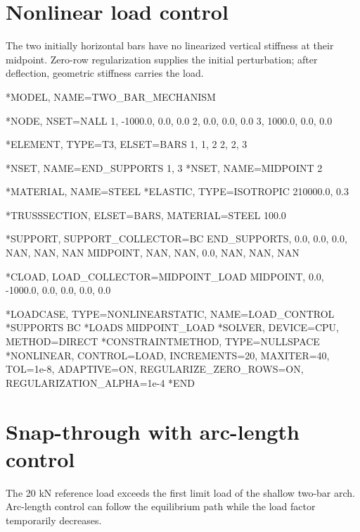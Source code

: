 \section{Nonlinear load control}

The two initially horizontal bars have no linearized vertical stiffness at their midpoint. Zero-row regularization supplies the initial perturbation; after deflection, geometric stiffness carries the load.

\begin{exampledeck}
*MODEL, NAME=TWO_BAR_MECHANISM

*NODE, NSET=NALL
1, -1000.0, 0.0, 0.0
2,     0.0, 0.0, 0.0
3,  1000.0, 0.0, 0.0

*ELEMENT, TYPE=T3, ELSET=BARS
1, 1, 2
2, 2, 3

*NSET, NAME=END_SUPPORTS
1, 3
*NSET, NAME=MIDPOINT
2

*MATERIAL, NAME=STEEL
*ELASTIC, TYPE=ISOTROPIC
210000.0, 0.3

*TRUSSSECTION, ELSET=BARS, MATERIAL=STEEL
100.0

*SUPPORT, SUPPORT_COLLECTOR=BC
END_SUPPORTS, 0.0, 0.0, 0.0, NAN, NAN, NAN
MIDPOINT, NAN, NAN, 0.0, NAN, NAN, NAN

*CLOAD, LOAD_COLLECTOR=MIDPOINT_LOAD
MIDPOINT, 0.0, -1000.0, 0.0, 0.0, 0.0, 0.0

*LOADCASE, TYPE=NONLINEARSTATIC, NAME=LOAD_CONTROL
*SUPPORTS
BC
*LOADS
MIDPOINT_LOAD
*SOLVER, DEVICE=CPU, METHOD=DIRECT
*CONSTRAINTMETHOD, TYPE=NULLSPACE
*NONLINEAR, CONTROL=LOAD, INCREMENTS=20, MAXITER=40, TOL=1e-8, ADAPTIVE=ON, REGULARIZE_ZERO_ROWS=ON, REGULARIZATION_ALPHA=1e-4
*END
\end{exampledeck}

\section{Snap-through with arc-length control}

The 20 kN reference load exceeds the first limit load of the shallow two-bar arch. Arc-length control can follow the equilibrium path while the load factor temporarily decreases.

